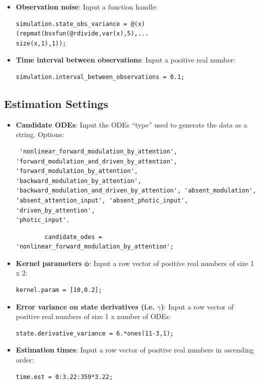 \begin{itemize}
   \item \textbf{Observation noise}: Input a function handle:
    \color{RoyalPurple}\begin{verbatim}
simulation.state_obs_variance = @(x)(repmat(bsxfun(@rdivide,var(x),5),...
size(x,1),1));
\end{verbatim} 
\color{black}

   \item \textbf{Time interval between observations}: Input a positive real number:
    \color{RoyalPurple}\begin{verbatim}
simulation.interval_between_observations = 0.1;
\end{verbatim} 
\color{black}
\end{itemize}
\vspace{1em}


\subsection{Estimation Settings}
\vspace{1em}
\begin{itemize}
   \item \textbf{Candidate ODEs}: Input the ODEs ``type'' used to generate the data as a string. Options: \begin{verbatim} 'nonlinear_forward_modulation_by_attention', 
'forward_modulation_and_driven_by_attention', 
'forward_modulation_by_attention', 'backward_modulation_by_attention', 
'backward_modulation_and_driven_by_attention', 'absent_modulation', 
'absent_attention_input', 'absent_photic_input', 'driven_by_attention', 
'photic_input'.
\end{verbatim} 

\color{RoyalPurple}\begin{verbatim}
        candidate_odes = 'nonlinear_forward_modulation_by_attention';
\end{verbatim} 
\color{black}

   \item \textbf{Kernel parameters} $\boldsymbol\phi$: Input a row vector of positive real numbers of size 1 x 2:
    \color{RoyalPurple}\begin{verbatim}
kernel.param = [10,0.2];
\end{verbatim} 
\color{black}

   \item \textbf{Error variance on state derivatives (i.e. $\gamma$)}: Input a row vector of positive real numbers of size 1 x number of ODEs:
    \color{RoyalPurple}\begin{verbatim}
state.derivative_variance = 6.*ones(11-3,1);
\end{verbatim} 
\color{black}

\setlength{\itemsep}{-1ex}
   \item \textbf{Estimation times}: Input a row vector of positive real numbers in ascending order:
    \color{RoyalPurple}\begin{verbatim}
time.est = 0:3.22:359*3.22;
\end{verbatim} 
\color{black}
\end{itemize}
\vspace{2em}

